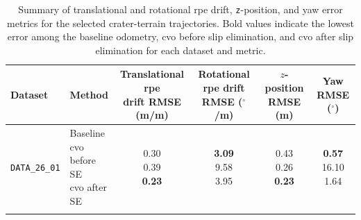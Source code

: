 \documentclass[report.tex]{subfiles}
\begin{document}
    \begin{table}[!htbp]
    \centering
    \caption[Summary of Crater Terrain Metrics]{Summary of translational and rotational \gls{rpe} drift,
    \texttt{z}-position, and yaw error metrics for the selected crater-terrain
    trajectories. Bold values indicate the lowest error among the baseline
    odometry, \gls{cvo} before slip elimination, and \gls{cvo} after slip
    elimination for each dataset and metric.}
    \label{tab:crater_terrain_metric_summary}

    \setlength{\tabcolsep}{4pt}
    \renewcommand{\arraystretch}{1.2}
    \renewcommand{\tabularxcolumn}[1]{m{#1}}

    \begin{tabularx}{\textwidth}{
        >{\raggedright\arraybackslash}m{2.0cm}
        >{\raggedright\arraybackslash}m{2.1cm}
        cccc
    }
        \toprule
        Dataset &
        Method &
        \makecell{Translational \gls{rpe}\\drift RMSE (m/m)} &
        \makecell{Rotational \gls{rpe}\\drift RMSE ($^\circ$/m)} &
        \makecell{$z$-position\\RMSE (m)} &
        \makecell{Yaw\\RMSE ($^\circ$)} \\
        \midrule

        \texttt{DATA\_26\_01}
        &
        \makecell[l]{
            Baseline\\
            \gls{cvo} before SE\\
            \gls{cvo} after SE
        }
        &
        \makecell{
            0.30\\
            0.39\\
            \textbf{0.23}
        }
        &
        \makecell{
            \textbf{3.09}\\
            9.58\\
            3.95
        }
        &
        \makecell{
            0.43\\
            0.26\\
            \textbf{0.23}
        }
        &
        \makecell{
            \textbf{0.57}\\
            16.10\\
            1.64
        }
        \\

        \addlinespace


\end{tabularx}
\end{table}
\end{document}
